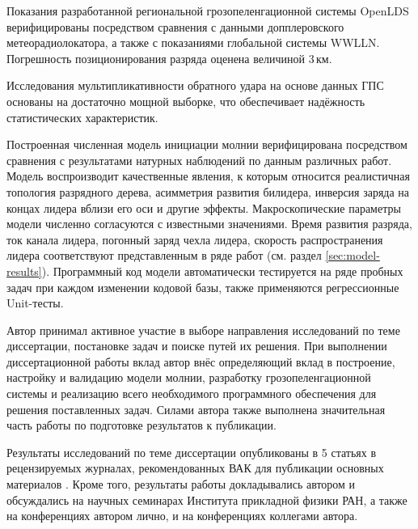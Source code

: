 {\reliability}
Показания разработанной региональной грозопеленгационной системы OpenLDS верифицированы посредством сравнения с данными допплеровского метеорадиолокатора, а также с показаниями глобальной системы WWLLN. Погрешность позиционирования разряда оценена величиной 3\,км. 

Исследования мультипликативности обратного удара на основе данных ГПС основаны на достаточно мощной выборке, что обеспечивает надёжность статистических характеристик.

Построенная численная модель инициации молнии верифицирована посредством сравнения с результатами натурных наблюдений по данным различных работ. Модель воспроизводит качественные явления, к которым относится реалистичная топология разрядного дерева, асимметрия развития билидера, инверсия заряда на концах лидера вблизи его оси и другие эффекты. Макроскопические параметры модели численно согласуются с известными значениями. Время развития разряда, ток канала лидера, погонный заряд чехла лидера, скорость распространения лидера соответствуют представленным в ряде работ (см. раздел \ref{sec:model-results}). Программный код модели автоматически тестируется на ряде пробных задач при каждом изменении кодовой базы, также применяются регрессионные Unit-тесты.



{\contribution}
Автор принимал активное участие в выборе направления исследований по теме диссертации, постановке задач и поиске путей их решения. При выполнении диссертационной работы вклад автор внёс определяющий вклад в построение, настройку и валидацию модели молнии, разработку грозопеленгационной системы и реализацию всего необходимого программного обеспечения для решения поставленных задач. Силами автора также выполнена значительная часть работы по подготовке результатов к публикации.

{\publications} Результаты исследований по теме диссертации опубликованы в 5 статьях в рецензируемых журналах, рекомендованных ВАК для публикации основных материалов \cite{Our2013, MareevWe2016, BulatovMiG, BulatovEnergetik2017, Bulatov2020}. Кроме того, результаты работы докладывались автором и обсуждались на научных семинарах Института прикладной физики РАН, а также на конференциях \cite{rcpl2014,Borok2014,rclp2016, rclp2018,Borok2017,NWP2017} автором лично, и на конференциях \cite{Kuterin2014, Shlyugaev2014, IudinArmenia2017, IudinChina2017} коллегами автора.
